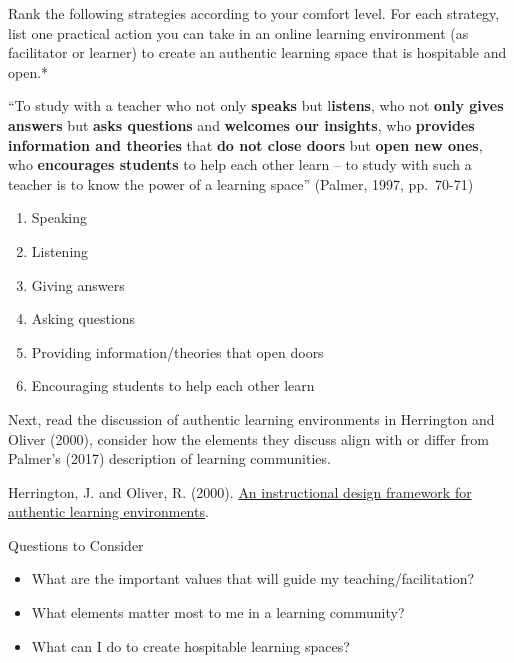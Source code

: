 \documentclass[
]{book}
\providecommand{\tightlist}{%
  \setlength{\itemsep}{0pt}\setlength{\parskip}{0pt}}
\begin{document}
\begin{reflect}
Rank the following strategies according to your comfort level. For each strategy, list one practical action you can take in an online learning environment (as facilitator or learner) to create an authentic learning space that is hospitable and open.*

``To study with a teacher who not only \textbf{speaks} but l\textbf{istens}, who not \textbf{only gives answers} but \textbf{asks questions} and \textbf{welcomes our insights}, who \textbf{provides information and theories} that \textbf{do not close doors} but \textbf{open new ones}, who \textbf{encourages students} to help each other learn -- to study with such a teacher is to know the power of a learning space'' (Palmer, 1997, pp.~70-71)

\begin{enumerate}
\def\labelenumi{\arabic{enumi}.}
\tightlist
\item
  Speaking\\
\item
  Listening\\
\item
  Giving answers\\
\item
  Asking questions\\
\item
  Providing information/theories that open doors\\
\item
  Encouraging students to help each other learn
\end{enumerate}

Next, read the discussion of authentic learning environments in Herrington and Oliver (2000), consider how the elements they discuss align with or differ from Palmer's (2017) description of learning communities.

Herrington, J. and Oliver, R. (2000). \href{https://ro.uow.edu.au/edupapers/31/}{An instructional design framework for authentic learning environments}.

{Questions to Consider}

\begin{itemize}
\tightlist
\item
  What are the important values that will guide my teaching/facilitation?\\
\item
  What elements matter most to me in a learning community?\\
\item
  What can I do to create hospitable learning spaces?
\end{itemize}
\end{reflect}
\end{document}
